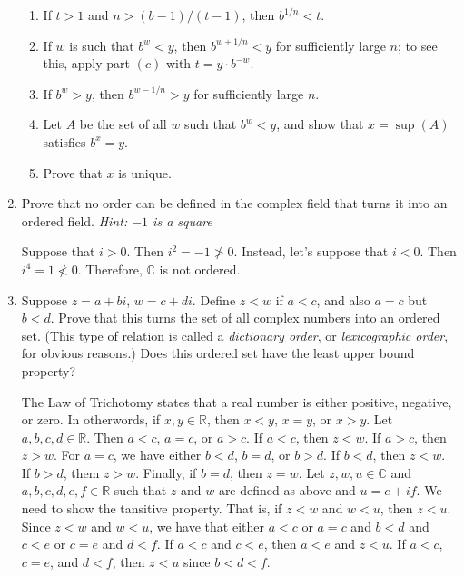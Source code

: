\begin{enumerate}
\begin{enumerate}[label = (\alph*)]
  \item
    If \(t > 1\) and \(n > (b - 1)/(t - 1)\), then \(b^{1/n} < t\).
  \item
    If \(w\) is such that \(b^w < y\), then \(b^{w + 1/n} < y\) for
    sufficiently large \(n\); to see this, apply part \((c)\) with
    \(t = y\cdot b^{-w}\).
  \item
    If \(b^w > y\), then \(b^{w - 1/n} > y\) for sufficiently large \(n\).
  \item
    Let \(A\) be the set of all \(w\) such that \(b^w < y\), and show that
    \(x = \sup(A)\) satisfies \(b^x = y\).
  \item
    Prove that \(x\) is unique.
  \end{enumerate}
\item
  Prove that no order can be defined in the complex field that turns it into an
  ordered field.
  \textit{Hint: \(-1\) is a square}
  \par\smallskip
  Suppose that \(i > 0\).
  Then \(i^2 = -1 \ngtr 0\).
  Instead, let's suppose that \(i < 0\).
  Then \(i^4 = 1 \nless 0\).
  Therefore, \(\mathbb{C}\) is not ordered.
\item
  Suppose \(z = a + bi\), \(w = c + di\).
  Define \(z < w\) if \(a < c\), and also \(a = c\) but \(b < d\).
  Prove that this turns the set of all complex numbers into an ordered set.
  (This type of relation is called a \textit{dictionary order}, or
  \textit{lexicographic order}, for obvious reasons.)
  Does this ordered set have the least upper bound property?
  \par\smallskip
  The Law of Trichotomy states that a real number is either positive,
  negative, or zero.
  In otherwords, if \(x,y\in\mathbb{R}\), then \(x < y\), \(x = y\), or
  \(x > y\).
  Let \(a,b,c,d\in\mathbb{R}\).
  Then \(a < c\), \(a = c\), or \(a > c\).
  If \(a < c\), then \(z < w\).
  If \(a > c\), then \(z > w\).
  For \(a = c\), we have either \(b < d\), \(b = d\), or \(b > d\).
  If \(b < d\), then \(z < w\).
  If \(b > d\), them \(z > w\).
  Finally, if \(b = d\), then \(z = w\).
  Let \(z,w,u\in\mathbb{C}\) and \(a,b,c,d,e,f\in\mathbb{R}\) such that
  \(z\) and \(w\) are defined as above and \(u = e + if\).
  We need to show the tansitive property.
  That is, if \(z < w\) and \(w < u\), then \(z < u\).
  Since \(z < w\) and \(w < u\), we have that either \(a < c\) or \(a = c\) and
  \(b < d\) and \(c < e\) or \(c = e\) and \(d < f\).
  If \(a < c\) and \(c < e\), then \(a < e\) and \(z < u\).
  If \(a < c\), \(c = e\), and \(d < f\), then \(z < u\) since \(b < d < f\).

\end{enumerate}
